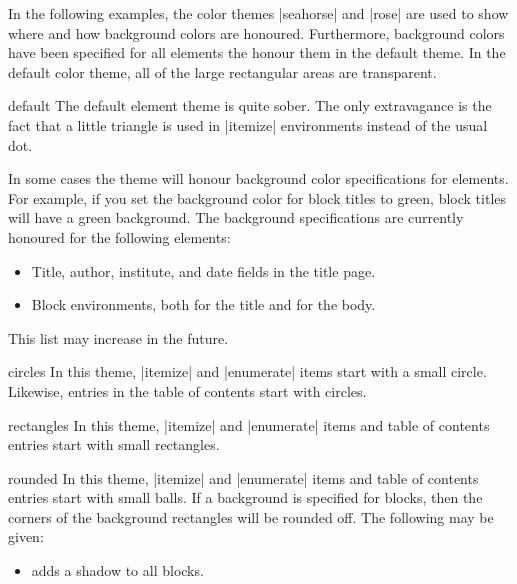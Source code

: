 In the following examples, the color themes |seahorse| and |rose| are
used to show where and how background colors are
honoured. Furthermore, background colors have been specified for all
elements the honour them in the default theme. In the default color
theme, all of the large rectangular areas are transparent.

\begin{innerthemeexample}{default}
  The default element theme is quite sober. The only extravagance is
  the fact that a little triangle is used in |itemize| environments
  instead of the usual dot.

  In some cases the theme will honour background color specifications
  for elements. For example, if you set the background color for block
  titles to green, block titles will have a green background. The
  background specifications are currently honoured for the following
  elements: 
  \begin{itemize}
  \item Title, author, institute, and date fields in the title
    page.
  \item Block environments, both for the title and for the body.
  \end{itemize}
  This list may increase in the future.
\end{innerthemeexample}

\begin{innerthemeexample}{circles}
  In this theme, |itemize| and |enumerate| items start with a small
  circle. Likewise, entries in the table of contents start with
  circles. 
\end{innerthemeexample}

\begin{innerthemeexample}{rectangles}
  In this theme, |itemize| and |enumerate| items and table of contents
  entries  start with small rectangles. 
\end{innerthemeexample}

\begin{innerthemeexample}{rounded}
  In this theme, |itemize| and |enumerate| items and table of contents
  entries start with small balls. If a background is specified for
  blocks, then the corners of the background rectangles will be
  rounded off. The following  may be given:

  \begin{itemize}
  \item {} adds a shadow to all blocks.
  \end{itemize}
\end{innerthemeexample}


